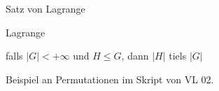 \documentclass[class=article, crop=false]{standalone}
\begin{document}
\begin{zettel}{Satz von Lagrange}
\begin{flashcard}{Lagrange}
	\begin{theorem}
		falls $ |G| <  + \infty $ und $H \leq G$, dann $ |H|$ tiels $ |G|$
	\end{theorem}
\end{flashcard}
\begin{example}
	Beispiel an Permutationen im Skript von VL 02.
\end{example}
\end{zettel}
\end{document}
